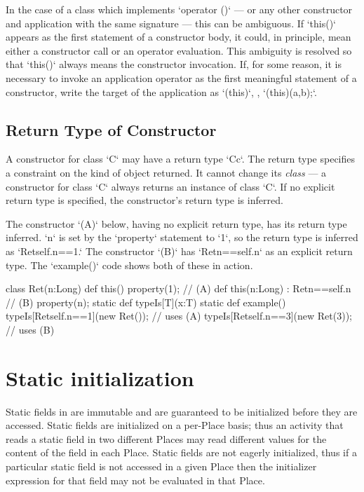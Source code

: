 In the case of a class which implements \xcd`operator ()` 
--- or any other constructor and application with the same signature --- 
this can be ambiguous.  If \xcd`this()` appears as the first statement of a
constructor body, it could, in principle, mean either a constructor call or an
operator evaluation.   This ambiguity is resolved so that \xcd`this()` always
means the constructor invocation.  If, for some reason, it is necessary to
invoke an application operator as the first meaningful statement of a
constructor, write the target of the application as \xcd`(this)`, \eg,
\xcd`(this)(a,b);`. 

\subsection{Return Type of Constructor}

A constructor for class \xcd`C` may have a return type \xcd`C{c}`.  The return
type specifies a constraint on the kind of object returned.  It cannot change
its {\em class} --- a constructor for class \xcd`C` always returns an instance
of class \xcd`C`.  
If no explicit return type is specified, the constructor's return type is
inferred.

\begin{ex}
The constructor \xcd`(A)` below, having no explicit return type, 
has its return type inferred.  
\xcd`n` is set by the \xcd`property` statement to \xcd`1`, so the return type
is inferred as \xcd`Ret{self.n==1}.`
The constructor \xcd`(B)` has \xcd`Ret{n==self.n}` as an explicit return type.
The \xcd`example()` code shows both of these in action.

\begin{xten}
class Ret(n:Long) {
   def this()    { property(1); }     // (A)
   def this(n:Long) : Ret{n==self.n} { // (B)
      property(n);
   }
   static def typeIs[T](x:T){}
   static def example() {
     typeIs[Ret{self.n==1}](new Ret());  // uses (A)
     typeIs[Ret{self.n==3}](new Ret(3)); // uses (B)
   }
}
\end{xten}
%


\end{ex}

\section{Static initialization}
\label{StaticInitialization}
Static fields in \Xten{} are immutable and are guaranteed to be
initialized before they are accessed. Static fields are initialized on
a per-Place basis; thus an activity that reads a static field in two
different Places may read different values for the content of the
field in each Place.  Static fields are not eagerly initialized, thus
if a particular static field is not accessed in a given Place then the
initializer expression for that field may not be evaluated in that
Place.

